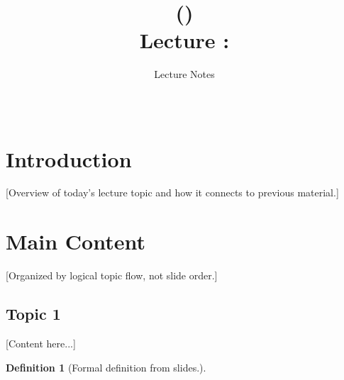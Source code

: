 \documentclass[11pt,a4paper]{article}
\title{\textbf{\coursename} (\coursenum) \\ Lecture \lecturenum: \lecturetitle}
\author{Lecture Notes}
\date{\lecturedate \\ \semester}
\theoremstyle{definition}
\newtheorem{definition}[theorem]{Definition}
\begin{document}
\maketitle

\tableofcontents
\newpage

% 
%

\section{Introduction}

[Overview of today's lecture topic and how it connects to previous material.]

\section{Main Content}

[Organized by logical topic flow, not slide order.]

\subsection{Topic 1}

[Content here...]

\begin{definition}
[Formal definition from slides.]
\end{definition}

\begin{professorsnote}
\end{professorsnote}
\end{document}
